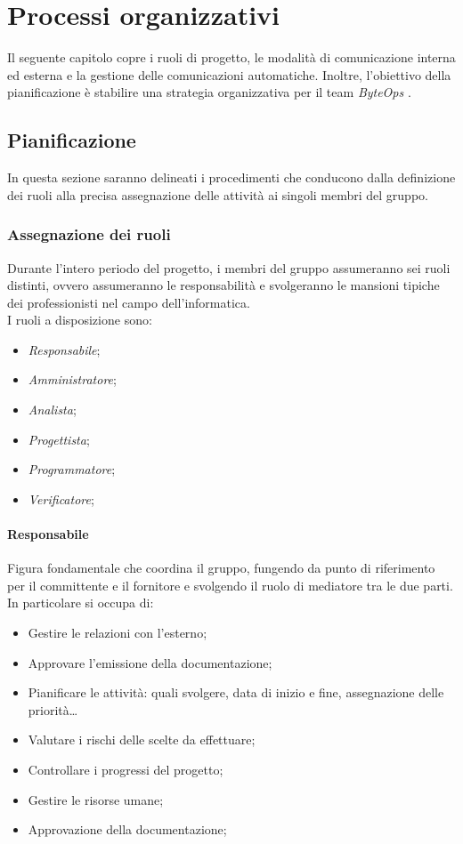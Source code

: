 \documentclass{article}
\begin{document}
\section{Processi organizzativi}
Il seguente capitolo copre i ruoli di progetto, le modalità di comunicazione interna ed esterna e la gestione delle comunicazioni automatiche. Inoltre, l'obiettivo della pianificazione è stabilire una strategia organizzativa per il team \textit{ByteOps} .   
    \subsection{Pianificazione}
    In questa sezione saranno delineati i procedimenti che conducono dalla definizione dei ruoli alla precisa assegnazione delle attività ai singoli membri del gruppo.
    \subsubsection{Assegnazione dei ruoli}

    Durante l'intero periodo del progetto, i membri del gruppo assumeranno sei ruoli distinti, ovvero assumeranno le responsabilità e svolgeranno le mansioni tipiche dei professionisti nel campo dell'informatica.
    \\I ruoli a disposizione sono:
    \begin{itemize}
        \item \textit{Responsabile};
        \item \textit{Amministratore};
        \item \textit{Analista};
        \item \textit{Progettista};
        \item \textit{Programmatore};
        \item \textit{Verificatore};
    \end{itemize}
        \paragraph{Responsabile} Figura fondamentale che coordina il gruppo, fungendo da punto di riferimento per il committente e il fornitore e svolgendo il ruolo di mediatore tra le due parti.\\
        In particolare si occupa di:
        \begin{itemize}
            \item Gestire le relazioni con l'esterno;
            \item Approvare l'emissione della documentazione;
            \item Pianificare le attività: quali svolgere, data di inizio e fine, assegnazione delle priorità\dots
            \item Valutare i rischi delle scelte da effettuare;
            \item Controllare i progressi del progetto;
            \item Gestire le risorse umane;
            \item Approvazione della documentazione;
        \end{itemize}
    
\end{document}
